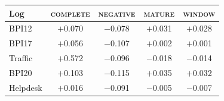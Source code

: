 \begin{tabular}{lcccc}
\toprule
Log & \textsc{complete} & \textsc{negative} & \textsc{mature} & \textsc{window} \\
\midrule
BPI12 & $+$0.070 & $-$0.078 & $+$0.031 & $+$0.028 \\
BPI17 & $+$0.056 & $-$0.107 & $+$0.002 & $+$0.001 \\
Traffic & $+$0.572 & $-$0.096 & $-$0.018 & $-$0.014 \\
BPI20 & $+$0.103 & $-$0.115 & $+$0.035 & $+$0.032 \\
Helpdesk & $+$0.016 & $-$0.091 & $-$0.005 & $-$0.007 \\
\bottomrule
\end{tabular}
